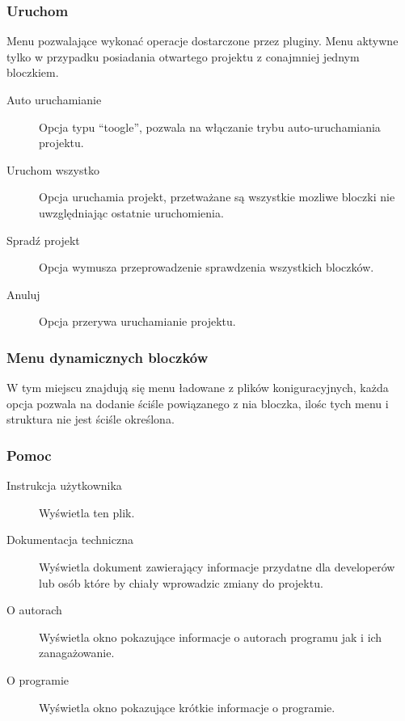 \documentclass[a4paper,10pt]{article}
\begin{document}
\subsubsection{Uruchom}
Menu pozwalające wykonać operacje dostarczone przez pluginy. Menu aktywne tylko w przypadku posiadania otwartego projektu z conajmniej jednym bloczkiem.
\begin{description}
\item [Auto uruchamianie] Opcja typu ``toogle'', pozwala na włączanie trybu auto-uruchamiania projektu.
\item [Uruchom wszystko] Opcja uruchamia projekt, przetważane są wszystkie mozliwe bloczki nie uwzględniając ostatnie uruchomienia.
\item [Spradź projekt] Opcja wymusza przeprowadzenie sprawdzenia wszystkich bloczków.
\item [Anuluj] Opcja przerywa uruchamianie projektu.
\end{description}

\subsubsection{Menu dynamicznych bloczków}
W tym miejscu znajdują się menu ładowane z plików koniguracyjnych, każda opcja pozwala na dodanie ściśle powiązanego z nia bloczka, ilośc tych menu i struktura nie jest ściśle określona.

\subsubsection{Pomoc}
\begin{description}
\item [Instrukcja użytkownika] Wyświetla ten plik.
\item [Dokumentacja techniczna] Wyświetla dokument zawierający informacje przydatne dla developerów lub osób które by chiały wprowadzic zmiany do projektu.
\item [O autorach] Wyświetla okno pokazujące informacje o autorach programu jak i ich zanagażowanie.
\item [O programie] Wyświetla okno pokazujące krótkie informacje o programie.
\end{description}
\end{document}
